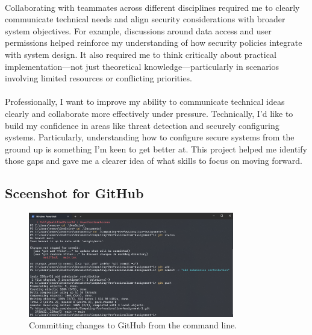 \documentclass[a4paper, 11pt]{report}
\begin{document}
\paragraph{}
Collaborating with teammates across different disciplines required me to clearly communicate technical needs and align security considerations with broader system objectives. For example, discussions around data access and user permissions helped reinforce my understanding of how security policies integrate with system design. It also required me to think critically about practical implementation—not just theoretical knowledge—particularly in scenarios involving limited resources or conflicting priorities.

\paragraph{}
Professionally, I want to improve my ability to communicate technical ideas clearly and collaborate more effectively under pressure. Technically, I’d like to build my confidence in areas like threat detection and securely configuring systems. Particularly, understanding how to configure secure systems from the ground up is something I’m keen to get better at. This project helped me identify those gaps and gave me a clearer idea of what skills to focus on moving forward.


\newpage

\subsection{Sceenshot for GitHub}
\begin{figure}[h]
    \centering
    \includegraphics[width=0.8\textwidth]{githubpush.png}
    \caption{Committing changes to GitHub from the command line.}
    \label{fig:my_label}
\end{figure}

\end{document}
